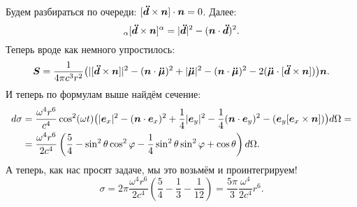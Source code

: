Будем разбираться по очереди: $[\mbox{\boldmath $\ddot{d}$} \times \mbox{\boldmath $n$}] \cdot \mbox{\boldmath $n$} = 0$.
Далее:
\begin{equation*}
    [\vc{\ddot{d}} \times \vc{n}]_\alpha [\vc{\ddot{d}} \times \vc{n}]^\alpha = |\vc{\ddot{d}}|^2 - (\vc{n} \cdot \vc{\ddot{d}})^2.
\end{equation*}
Теперь вроде как немного упростилось:
\begin{equation*}
    \mbox{\boldmath $S$} = \frac{1}{4 \pi c^3 r^2} \big( |[\mbox{\boldmath $\ddot{d}$} \times \mbox{\boldmath $n$}]|^2 - (\mbox{\boldmath $n$} \cdot \mbox{\boldmath $\ddot{\mu}$})^2 + |\mbox{\boldmath $\ddot{\mu}$}|^2 - (\mbox{\boldmath $n$} \cdot \mbox{\boldmath $\ddot{\mu}$})^2 - 2 (\mbox{\boldmath $\ddot{\mu}$} \cdot [\mbox{\boldmath $\ddot{d}$} \times \mbox{\boldmath $n$}]) \big) \mbox{\boldmath $n$}.
\end{equation*}
И теперь по формулам выше найдём сечение:
\begin{align*}
    d \sigma &= \frac{\omega^4 r^6}{c^4} \cos^2 (\omega t)\big( |\mbox{\boldmath $e$}_x|^2 - (\mbox{\boldmath $n$} \cdot \mbox{\boldmath $e$}_x)^2 + \frac{1}{4}|\mbox{\boldmath $e$}_y|^2 - \frac{1}{4} (\mbox{\boldmath $n$} \cdot \mbox{\boldmath $e$}_y)^2 - (\mbox{\boldmath $e$}_y [\mbox{\boldmath $e$}_x \times \mbox{\boldmath $n$}])\big) d \Omega 
    = \\ &= 
    \frac{\omega^4 r^6}{2 c^4}
    \left( \frac{5}{4} - \sin^2 \theta \cos^2 \varphi - \frac{1}{4} \sin^2 \theta \sin^2 \varphi + \cos \theta\right) d \Omega.
\end{align*}
А теперь, как нас просят  задаче, мы это возьмём и проинтегрируем!
\begin{equation*}
    \sigma = 2 \pi \frac{\omega^4 r^6}{2 c^4} \left(\frac{5}{4} -\frac{1}{3} - \frac{1}{12}\right) =  \frac{5 \pi}{3} \frac{\omega^4}{2 c^4} r^6.
\end{equation*}